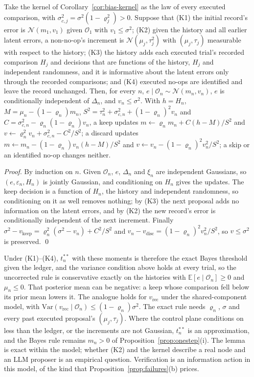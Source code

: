 \begin{lemma}\label{lem:app-kalman}
Take the kernel of Corollary~\ref{cor:bias-kernel} as the law of every executed comparison, with $\sigma_{c,j}^2=\sigma^2(1-\varrho_j^2)>0$. Suppose that (K1) the initial record's error is $\mathcal{N}(m_1,v_1)$ given $\mathcal{O}_1$ with $v_1\le\sigma^2$; (K2) given the history and all earlier latent errors, a non-no-op's increment is $\mathcal{N}(\mu_j,\tau_j^2)$ with $(\mu_j,\tau_j)$ measurable with respect to the history; (K3) the history adds each executed trial's recorded comparison $H_j$ and decisions that are functions of the history, $H_j$ and independent randomness, and it is informative about the latent errors only through the recorded comparisons; and (K4) executed no-ops are identified and leave the record unchanged. Then, for every $n$, $e\mid\mathcal{O}_n\sim\mathcal{N}(m_n,v_n)$, $e$ is conditionally independent of $\Delta_n$, and $v_n\le\sigma^2$. With $h=H_n$, $M=\mu_n-(1-\varrho_n)m_n$, $S^2=\tau_n^2+\sigma_{c,n}^2+(1-\varrho_n)^2v_n$ and $C=\sigma_{c,n}^2-\varrho_n(1-\varrho_n)v_n$, a keep updates $m\leftarrow\varrho_nm_n+C(h-M)/S^2$ and $v\leftarrow\varrho_n^2v_n+\sigma_{c,n}^2-C^2/S^2$; a discard updates $m\leftarrow m_n-(1-\varrho_n)v_n(h-M)/S^2$ and $v\leftarrow v_n-(1-\varrho_n)^2v_n^2/S^2$; a skip or an identified no-op changes neither.
\end{lemma}

\emph{Proof.} By induction on $n$. Given $\mathcal{O}_n$, $e$, $\Delta_n$ and $\xi_n$ are independent Gaussians, so $(e,\varepsilon_n,H_n)$ is jointly Gaussian, and conditioning on $H_n$ gives the updates. The keep decision is a function of $H_n$, the history and independent randomness, so conditioning on it as well removes nothing; by (K3) the next proposal adds no information on the latent errors, and by (K2) the new record's error is conditionally independent of the next increment. Finally $\sigma^2-v_{\mathrm{keep}}=\varrho_n^2(\sigma^2-v_n)+C^2/S^2$ and $v_n-v_{\mathrm{disc}}=(1-\varrho_n)^2v_n^2/S^2$, so $v\le\sigma^2$ is preserved. \qed

Under (K1)--(K4), $t^{**}_n$ with these moments is therefore the exact Bayes threshold given the ledger, and the variance condition above holds at every trial, so the uncorrected rule is conservative exactly on the histories with $\mathbb{E}[e\mid\mathcal{O}_n]\ge0$ and $\mu_n\le0$. That posterior mean can be negative: a keep whose comparison fell below its prior mean lowers it. The analogue holds for $v_{\mathrm{rec}}$ under the shared-component model, with $\mathrm{Var}(v_{\mathrm{rec}}\mid\mathcal{O}_n)\le(1-\varrho_n)\sigma^2$. The exact rule needs $\varrho_n$, $\sigma$ and every past executed proposal's $(\mu_j,\tau_j)$. Where the control plane conditions on less than the ledger, or the increments are not Gaussian, $t^{**}_n$ is an approximation, and the Bayes rule remains $m_n>0$ of Proposition~\ref{prop:onestep}(i). The lemma is exact within the model; whether (K2) and the kernel describe a real node and an LLM proposer is an empirical question. Verification is an information action in this model, of the kind that Proposition~\ref{prop:failures}(b) prices.

